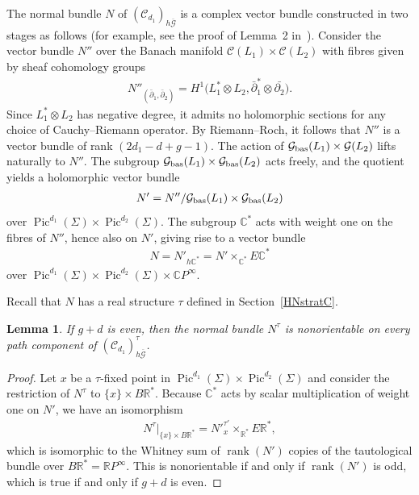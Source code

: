 \documentclass[pdftex]{sigma}
\numberwithin{equation}{section}
\newtheorem{Lemma}[Theorem]{Lemma}
\begin{document}
The normal bundle $N$ of $({\mathcal C}_{d_1})_{h\overline{{\mathcal G}}}$ is a complex vector bundle constructed in two stages as follows (for example, see the proof of Lemma~2 in~\cite{K}). Consider the vector bundle $N''$ over the Banach manifold ${\mathcal C}(L_1) \times {\mathcal C}(L_2)$ with f\/ibres given by sheaf cohomology groups \begin{gather*}N''_{(\bar{\partial}_1, \bar{\partial}_2)} = H^1\big( L_1^* \otimes L_2,\bar{\partial}_1^* \otimes \bar{\partial_2}\big). \end{gather*}
Since $L_1^* \otimes L_2$ has negative degree, it admits no holomorphic sections for any choice of Cauchy--Riemann operator. By Riemann--Roch, it follows that $N'' $ is a vector bundle of rank $(2d_1-d +g-1)$. The action of ${\mathcal G}_{\rm bas}(L_1) \times {\mathcal G}(L_2)$ lifts naturally to $N''$. The subgroup ${\mathcal G}_{\rm bas}(L_1) \times {\mathcal G}_{\rm bas}(L_2)$ acts freely, and the quotient yields a holomorphic vector bundle \begin{gather*}N' = N'' / {\mathcal G}_{\rm bas}(L_1) \times {\mathcal G}_{\rm bas}(L_2)\end{gather*} over $ \operatorname{Pic}^{d_1}(\Sigma) \times \operatorname{Pic}^{d_2}(\Sigma)$. The subgroup ${\mathbb C}^*$ acts with weight one on the f\/ibres of $N''$, hence also on $N'$, giving rise to a vector bundle \begin{gather*}N = N'_{h {\mathbb C}^*}= N' \times_{{\mathbb C}^*} E{\mathbb C}^*\end{gather*} over $\operatorname{Pic}^{d_1}(\Sigma) \times \operatorname{Pic}^{d_2}(\Sigma) \times {\mathbb C} P^{\infty}.$

Recall that $ N$ has a real structure $\tau$ def\/ined in Section~\ref{HNstratC}.

\begin{Lemma}\label{g+deven}
If $g+d$ is even, then the normal bundle $N^{\tau}$ is nonorientable on every path component of $({\mathcal C}_{d_1})_{h\overline{{\mathcal G}}}^{\tau}$.
\end{Lemma}

\begin{proof}
Let $x$ be a $\tau$-f\/ixed point in $\operatorname{Pic}^{d_1}(\Sigma) \times \operatorname{Pic}^{d_2}(\Sigma)$ and consider the restriction of $N^{\tau}$ to $\{x\} \times B {\mathbb R}^*$. Because ${\mathbb C}^*$ acts by scalar multiplication of weight one on $N'$, we have an isomorphism \begin{gather*}N^{\tau}|_{\{x\} \times B {\mathbb R}^*} = N'^{\tau'}_x \times_{{\mathbb R}^*} E {\mathbb R}^*, \end{gather*} which is isomorphic to the Whitney sum of $\operatorname{rank}(N')$ copies of the tautological bundle over $B {\mathbb R}^* = {\mathbb R} P^{\infty}$. This is nonorientable if and only if $\operatorname{rank}(N')$ is odd, which is true if and only if $g+d$ is even.
\end{proof}
\end{document}
